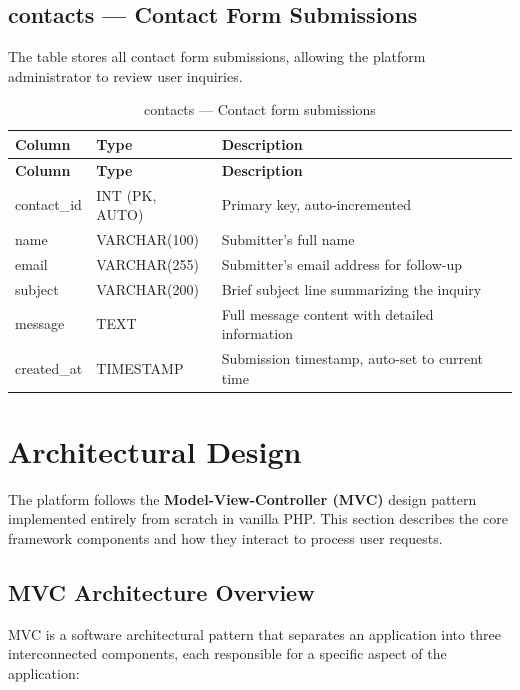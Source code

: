 \documentclass[12pt,a4paper]{report}
\begin{document}
\subsection{contacts — Contact Form Submissions}

The  table stores all contact form submissions, allowing the platform administrator to review user inquiries.

\begin{longtable}{|p{3.5cm}|p{3cm}|p{7cm}|}
    \caption{contacts — Contact form submissions}
    \label{tab:contacts} \\
    \toprule
    \textbf{Column} & \textbf{Type} & \textbf{Description} \\
    \midrule
    \endfirsthead
    \toprule
    \textbf{Column} & \textbf{Type} & \textbf{Description} \\
    \midrule
    \endhead
    contact\_id & INT (PK, AUTO) & Primary key, auto-incremented \\
    name & VARCHAR(100) & Submitter's full name \\
    email & VARCHAR(255) & Submitter's email address for follow-up \\
    subject & VARCHAR(200) & Brief subject line summarizing the inquiry \\
    message & TEXT & Full message content with detailed information \\
    created\_at & TIMESTAMP & Submission timestamp, auto-set to current time \\
    \bottomrule
\end{longtable}

\section{Architectural Design}

The platform follows the \textbf{Model-View-Controller (MVC)} design pattern implemented entirely from scratch in vanilla PHP. This section describes the core framework components and how they interact to process user requests.

\subsection{MVC Architecture Overview}

MVC is a software architectural pattern that separates an application into three interconnected components, each responsible for a specific aspect of the application:
\end{document}
